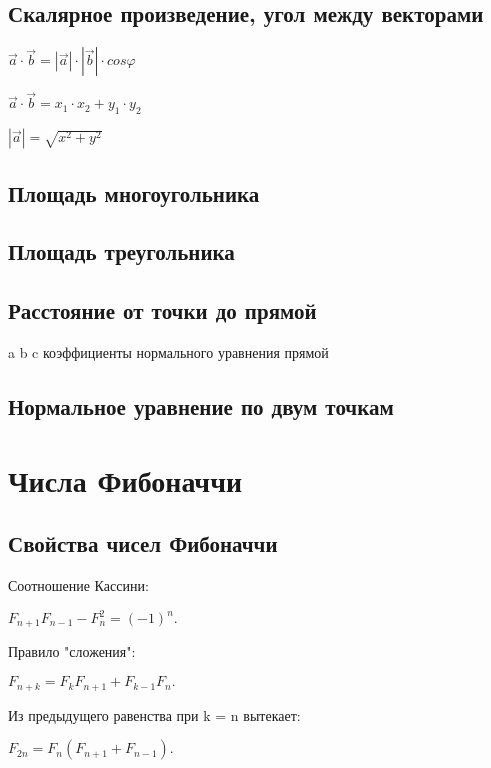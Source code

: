 \documentclass[a4paper]{article}
\begin{document}
\begin{multicols*}{2}
		 \subsection{Скалярное произведение, угол между векторами}
		 
		 $\vec a \cdot \vec b = |\vec a| \cdot |\vec b| \cdot cos \varphi$
		 
		 $\vec a \cdot \vec b = x_1 \cdot x_2 + y_1 \cdot y_2$
		 
		 $|\vec a| = \sqrt{x^2 + y^2}$
		 
		 \subsection{Площадь многоугольника}
		 		 
		 \subsection{Площадь треугольника}
		 
		 \subsection{Расстояние от точки до прямой}
		 a b c коэффициенты нормального уравнения прямой
		 
		 \subsection{Нормальное уравнение по двум точкам}
		 	
		 
		 \section{Числа Фибоначчи}		 
		 \subsection{Свойства чисел Фибоначчи}
		 
		 Соотношение Кассини:
		 
		 $F_{n+1} F_{n-1} - F_n^2 = (-1)^n.$
		 
		 Правило "сложения":
		 
		 $F_{n+k} = F_k F_{n+1} + F_{k-1} F_n.$ 
		 
		 Из предыдущего равенства при k = n вытекает:
		 
		 $F_{2n} = F_n (F_{n+1} + F_{n-1}).$ 
		 

\end{multicols*}
\end{document}
